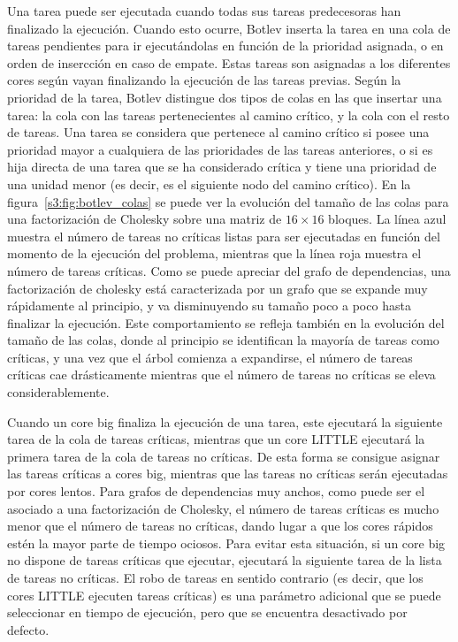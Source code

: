 Una tarea puede ser ejecutada cuando todas sus tareas predecesoras han
finalizado la ejecución. Cuando esto ocurre, Botlev inserta la tarea en una
cola de tareas pendientes para ir ejecutándolas en función de la prioridad
asignada, o en orden de insercción en caso de empate. Estas tareas son
asignadas a los diferentes cores según vayan finalizando la ejecución de
las tareas previas. Según la prioridad de la tarea, Botlev distingue dos
tipos de colas en las que insertar una tarea: la cola con las tareas
pertenecientes al camino crítico, y la cola con el resto de tareas. Una
tarea se considera que pertenece al camino crítico si posee una prioridad
mayor a cualquiera de las prioridades de las tareas anteriores, o si es
hija directa de una tarea que se ha considerado crítica y tiene una
prioridad de una unidad menor (es decir, es el siguiente nodo del camino
crítico). En la figura~\ref{s3:fig:botlev_colas} se puede ver la evolución
del tamaño de las colas para una factorización de Cholesky sobre una matriz
de $16\times16$ bloques. La línea azul muestra el número de tareas no
críticas listas para ser ejecutadas en función del momento de la ejecución
del problema, mientras que la línea roja muestra el número de tareas
críticas. Como se puede apreciar del grafo de dependencias, una
factorización de cholesky está caracterizada por un grafo que se expande
muy rápidamente al principio, y va disminuyendo su tamaño poco a poco hasta
finalizar la ejecución. Este comportamiento se refleja también en la
evolución del tamaño de las colas, donde al principio se identifican la
mayoría de tareas como críticas, y una vez que el árbol comienza a
expandirse, el número de tareas críticas cae drásticamente mientras que el
número de tareas no críticas se eleva considerablemente. 

Cuando un core big finaliza la ejecución de una tarea, este ejecutará la
siguiente tarea de la cola de tareas críticas, mientras que un core LITTLE
ejecutará la primera tarea de la cola de tareas no críticas. De esta forma
se consigue asignar las tareas críticas a cores big, mientras que las
tareas no críticas serán ejecutadas por cores lentos. Para grafos de
dependencias muy anchos, como puede ser el asociado a una factorización de
Cholesky, el número de tareas críticas es mucho menor que el número de
tareas no críticas, dando lugar a que los cores rápidos estén la mayor
parte de tiempo ociosos. Para evitar esta situación, si un core big no
dispone de tareas críticas que ejecutar, ejecutará la siguiente tarea de la
lista de tareas no críticas. El robo de tareas en sentido contrario (es
decir, que los cores LITTLE ejecuten tareas críticas) es una parámetro
adicional que se puede seleccionar en tiempo de ejecución, pero que se
encuentra desactivado por defecto.




